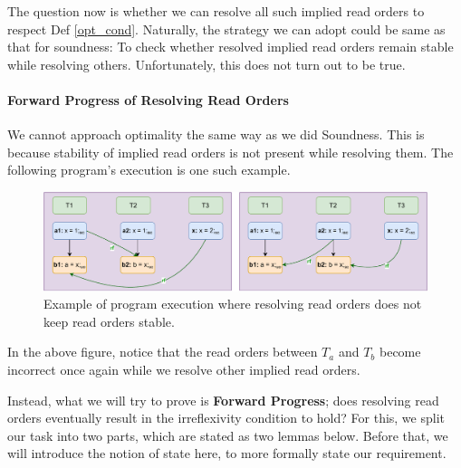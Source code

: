         The question now is whether we can resolve all such implied read orders to respect Def \ref{opt_cond}. 
        Naturally, the strategy we can adopt could be same as that for soundness: To check whether resolved implied read orders remain stable while resolving others. 
        Unfortunately, this does not turn out to be true.
    

    \paragraph{Forward Progress of Resolving Read Orders}

        We cannot approach optimality the same way as we did Soundness.
        This is because stability of implied read orders is not present while resolving them.
        The following program's execution is one such example.
        
        \begin{figure}
            \centering
            \includegraphics{Equivalence_Example.pdf}
            \caption{Example of program execution where resolving read orders does not keep read orders stable.}
            \label{read_ord:instability}
        \end{figure}

        In the above figure, notice that the read orders between $T_a$ and $T_b$ become incorrect once again while we resolve other implied read orders.
        


        Instead, what we will try to prove is \textbf{Forward Progress}; does resolving read orders eventually result in the irreflexivity condition to hold? 
        For this, we split our task into two parts, which are stated as two lemmas below. 
        Before that, we will introduce the notion of state here, to more formally state our requirement. 
        
